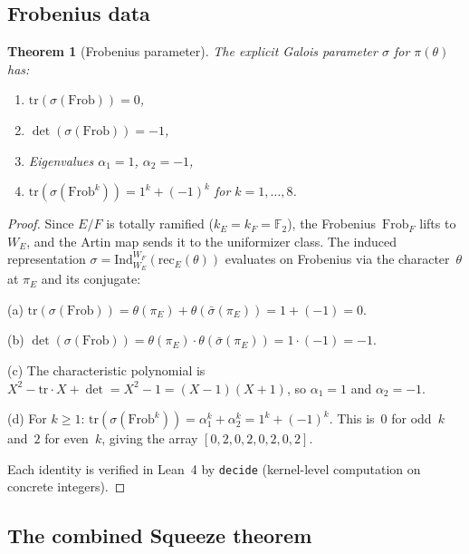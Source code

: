 \documentclass[11pt]{article}
\theoremstyle{plain}
\newtheorem{theorem}{Theorem}[section]
\theoremstyle{definition}
\theoremstyle{remark}
\newcommand{\F}{\mathbb{F}}
\newcommand{\Frob}{\mathrm{Frob}}
\newcommand{\tr}{\mathrm{tr}}
\newcommand{\Ind}{\mathrm{Ind}}
\newcommand{\rec}{\mathrm{rec}}
\begin{document}
\subsection{Frobenius data}

\begin{theorem}[Frobenius parameter]\label{thm:frob}
The explicit Galois parameter $\sigma$ for $\pi(\theta)$ has:
\begin{enumerate}[nosep,label=(\alph*)]
\item $\tr(\sigma(\Frob)) = 0$,
\item $\det(\sigma(\Frob)) = -1$,
\item Eigenvalues $\alpha_1 = 1$, $\alpha_2 = -1$,
\item $\tr(\sigma(\Frob^k)) = 1^k + (-1)^k$ for
  $k = 1, \ldots, 8$.
\end{enumerate}
\end{theorem}
\begin{proof}
Since $E/F$ is totally ramified ($k_E = k_F = \F_2$),
the Frobenius~$\Frob_F$ lifts to~$W_E$, and the Artin
map sends it to the uniformizer class.  The induced
representation $\sigma = \Ind_{W_E}^{W_F}(\rec_E(\theta))$
evaluates on Frobenius via the character~$\theta$ at
$\pi_E$ and its conjugate:

\noindent
(a) $\tr(\sigma(\Frob)) = \theta(\pi_E) + \theta(\bar\sigma(\pi_E))
= 1 + (-1) = 0$.

\noindent
(b) $\det(\sigma(\Frob)) = \theta(\pi_E) \cdot
\theta(\bar\sigma(\pi_E)) = 1 \cdot (-1) = -1$.

\noindent
(c) The characteristic polynomial is
$X^2 - \tr \cdot X + \det = X^2 - 1 = (X-1)(X+1)$,
so $\alpha_1 = 1$ and $\alpha_2 = -1$.

\noindent
(d) For $k \geq 1$: $\tr(\sigma(\Frob^k)) = \alpha_1^k + \alpha_2^k
= 1^k + (-1)^k$.  This is~$0$ for odd~$k$ and~$2$ for even~$k$,
giving the array $[0, 2, 0, 2, 0, 2, 0, 2]$.

Each identity is verified in Lean~4 by \texttt{decide}
(kernel-level computation on concrete integers).
\end{proof}

\subsection{The combined Squeeze theorem}
\end{document}
